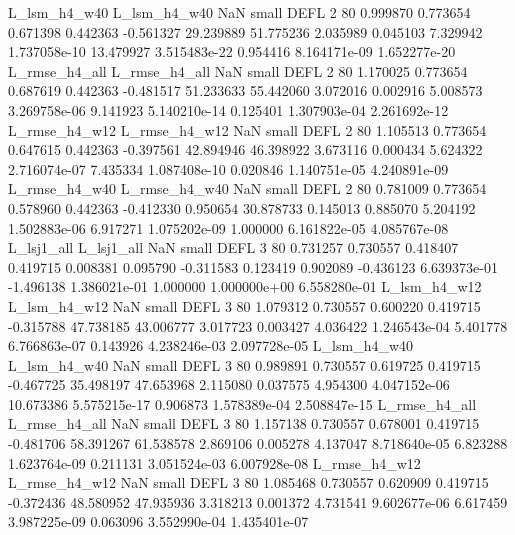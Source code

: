  L_lsm_h4_w40  L_lsm_h4_w40                   NaN      small     DEFL                 2 80 0.999870       0.773654 0.671398       0.442363   -0.561327     29.239889     51.775236     2.035989       0.045103  7.329942 1.737058e-10    13.479927   3.515483e-22            0.954416    8.164171e-09        1.652277e-20
L_rmse_h4_all L_rmse_h4_all                   NaN      small     DEFL                 2 80 1.170025       0.773654 0.687619       0.442363   -0.481517     51.233633     55.442060     3.072016       0.002916  5.008573 3.269758e-06     9.141923   5.140210e-14            0.125401    1.307903e-04        2.261692e-12
L_rmse_h4_w12 L_rmse_h4_w12                   NaN      small     DEFL                 2 80 1.105513       0.773654 0.647615       0.442363   -0.397561     42.894946     46.398922     3.673116       0.000434  5.624322 2.716074e-07     7.435334   1.087408e-10            0.020846    1.140751e-05        4.240891e-09
L_rmse_h4_w40 L_rmse_h4_w40                   NaN      small     DEFL                 2 80 0.781009       0.773654 0.578960       0.442363   -0.412330      0.950654     30.878733     0.145013       0.885070  5.204192 1.502883e-06     6.917271   1.075202e-09            1.000000    6.161822e-05        4.085767e-08
   L_lsj1_all    L_lsj1_all                   NaN      small     DEFL                 3 80 0.731257       0.730557 0.418407       0.419715    0.008381      0.095790     -0.311583     0.123419       0.902089 -0.436123 6.639373e-01    -1.496138   1.386021e-01            1.000000    1.000000e+00        6.558280e-01
 L_lsm_h4_w12  L_lsm_h4_w12                   NaN      small     DEFL                 3 80 1.079312       0.730557 0.600220       0.419715   -0.315788     47.738185     43.006777     3.017723       0.003427  4.036422 1.246543e-04     5.401778   6.766863e-07            0.143926    4.238246e-03        2.097728e-05
 L_lsm_h4_w40  L_lsm_h4_w40                   NaN      small     DEFL                 3 80 0.989891       0.730557 0.619725       0.419715   -0.467725     35.498197     47.653968     2.115080       0.037575  4.954300 4.047152e-06    10.673386   5.575215e-17            0.906873    1.578389e-04        2.508847e-15
L_rmse_h4_all L_rmse_h4_all                   NaN      small     DEFL                 3 80 1.157138       0.730557 0.678001       0.419715   -0.481706     58.391267     61.538578     2.869106       0.005278  4.137047 8.718640e-05     6.823288   1.623764e-09            0.211131    3.051524e-03        6.007928e-08
L_rmse_h4_w12 L_rmse_h4_w12                   NaN      small     DEFL                 3 80 1.085468       0.730557 0.620909       0.419715   -0.372436     48.580952     47.935936     3.318213       0.001372  4.731541 9.602677e-06     6.617459   3.987225e-09            0.063096    3.552990e-04        1.435401e-07
